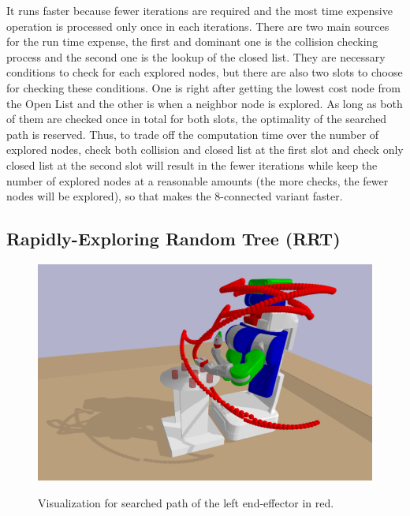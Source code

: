 \documentclass{article}
\theoremstyle{definition} %
\begin{document}
It runs faster because fewer iterations are required and the most time expensive operation is processed only once in each iterations. There are two main sources for the run time expense, the first and dominant one is the collision checking process and the second one is the lookup of the closed list. They are necessary conditions to check for each explored nodes, but there are also two slots to choose for checking these conditions. One is right after getting the lowest cost node from the Open List and the other is when a neighbor node is explored. As long as both of them are checked once in total for both slots, the optimality of the searched path is reserved. Thus, to trade off the computation time over the number of explored nodes, check both collision and closed list at the first slot and check only closed list at the second slot will result in the fewer iterations while keep the number of explored nodes at a reasonable amounts (the more checks, the fewer nodes will be explored), so that makes the 8-connected variant faster.



\subsection*{Rapidly-Exploring Random Tree (RRT)}

\begin{figure}[H]
    \centering
        \textsf{\includegraphics[width=0.7\columnwidth]{rrt_raw.png}}
        \caption{Visualization for searched path of the left end-effector in red.}
        \label{fig:rrt_raw}
\end{figure}
\end{document}
